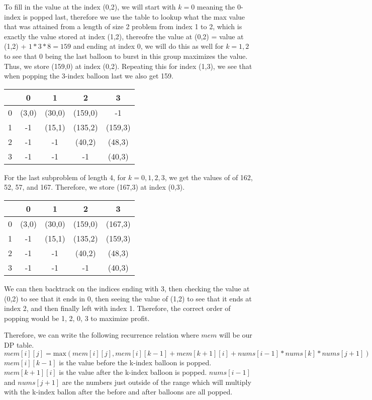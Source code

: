 \documentclass[12pt]{article}
\begin{document}
To fill in the value at the index (0,2), we will start with $k=0$ meaning the 0-index is popped last, therefore we use the table to lookup what the max value that was attained from a length of size 2 problem from index 1 to 2, which is exactly the value stored at index (1,2), thereofre the value at (0,2) = value at (1,2) + $1*3*8 = 159$ and ending at index 0, we will do this as well for $k=1,2$ to see that 0 being the last balloon to burst in this group maximizes the value. Thus, we store (159,0) at index (0,2). Repeating this for index (1,3), we see that when popping the 3-index balloon last we also get 159.
\begin{center}
    \begin{tabular}{ |c|c|c|c|c| } 
      \hline
         & 0 & 1 & 2 & 3 \\ 
      \hline
      0 & (3,0) & (30,0) & (159,0)& -1\\ 
      \hline
      1 & -1 & (15,1) & (135,2) & (159,3)\\ 
      \hline
      2 & -1 & -1 & (40,2) & (48,3)\\ 
      \hline
      3 & -1 & -1 & -1 & (40,3)\\ 
      \hline
    \end{tabular}
\end{center}
For the last subproblem of length 4, for $k=0,1,2,3$, we get the values of of 162, 52, 57, and 167. Therefore, we store (167,3) at index (0,3).  
\begin{center}
    \begin{tabular}{ |c|c|c|c|c| } 
      \hline
         & 0 & 1 & 2 & 3 \\ 
      \hline
      0 & (3,0) & (30,0) & (159,0)& (167,3)\\ 
      \hline
      1 & -1 & (15,1) & (135,2) & (159,3)\\ 
      \hline
      2 & -1 & -1 & (40,2) & (48,3)\\ 
      \hline
      3 & -1 & -1 & -1 & (40,3)\\ 
      \hline
    \end{tabular}
\end{center}
We can then backtrack on the indices ending with 3, then checking the value at (0,2) to see that it ends in 0, then seeing the value of (1,2) to see that it ends at index 2, and then finally left with index 1. Therefore, the correct order of popping would be 1, 2, 0, 3 to maximize profit.

Therefore, we can write the following recurrence relation where $mem$ will be our DP table. 
$$
mem[i][j] = \text{max}(mem[i][j], mem[i][k-1]+mem[k+1][i] + nums[i-1]*nums[k]*nums[j+1])
$$
$mem[i][k-1]$ is the value before the k-index balloon is popped. $mem[k+1][i]$ is the value after the k-index balloon is popped. $nums[i-1]$ and $nums[j+1]$ are the numbers just outside of the range which will multiply with the k-index ballon after the before and after balloons are all popped.
\end{document}
